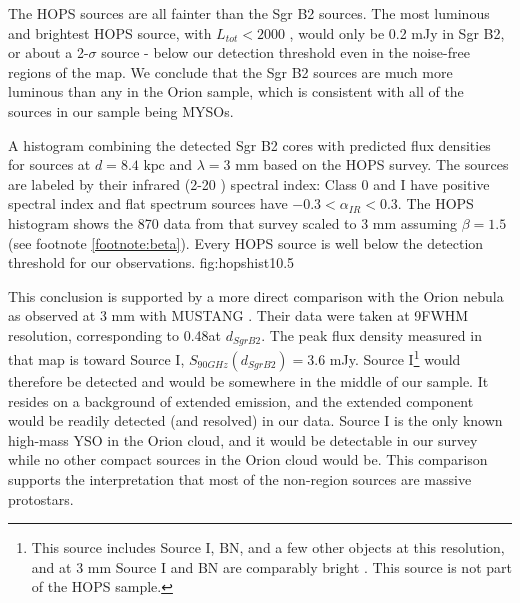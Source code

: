 \documentclass[twocolumn]{aastex61}
\newcommand{\dsgrb}{\ensuremath{8.4\textrm{~kpc}}\xspace}
\begin{document}
The HOPS sources are all fainter than the Sgr B2 sources.  The most luminous
and brightest HOPS source, with $L_{tot}<2000$ \lsun, would only be 0.2 mJy in
Sgr B2, or about a 2-$\sigma$ source - below our detection threshold even in
the noise-free regions of the map.  We  conclude that the Sgr B2 sources are
much more luminous than any in the Orion sample, which is consistent with all
of the sources in our sample being MYSOs.

{A histogram combining the detected Sgr B2 cores with predicted flux densities
for sources at $d=\dsgrb$ and $\lambda=3$ mm
based on the HOPS \citep{Furlan2016a} survey.  The sources are labeled by their
infrared (2-20 \um) spectral index: Class 0 and I have positive spectral index
and flat spectrum sources have $-0.3 < \alpha_{IR} < 0.3$. The HOPS histogram
shows the 870 \um data from that survey scaled to 3 mm
assuming $\beta=1.5$ (see footnote \ref{footnote:beta}).
Every HOPS source is well below the detection threshold for our observations.}
{fig:hopshist}{1}{0.5\textwidth}

This conclusion is supported by a more direct comparison with the Orion nebula
as observed at 3 mm with MUSTANG \citep[][Figure
\ref{fig:orioncompare}]{Dicker2009a}.  Their data were taken at
9\arcsec FWHM resolution, corresponding to 0.48\arcsec at $d_{Sgr B2}$.  The
peak flux density measured in that map is toward Source I, $S_{90 GHz}(d_{Sgr
B2}) = 3.6$ mJy.  Source I\footnote{This source includes Source I, BN, and a few
other objects at this resolution, and at 3 mm Source I and BN are comparably
bright \citep{Plambeck2013a}.  This source is not part of the HOPS sample.}
would therefore  be detected and would be
somewhere in the middle of our sample.  It resides on a background of
extended emission, and the
extended component would be readily detected (and resolved) in our data. 
Source I is the only known high-mass YSO in the Orion cloud, and it would
be detectable in our survey while no other compact sources in the Orion cloud
would be.  This comparison supports the interpretation that most of the
non-\hii region sources are massive protostars.

\end{document}
